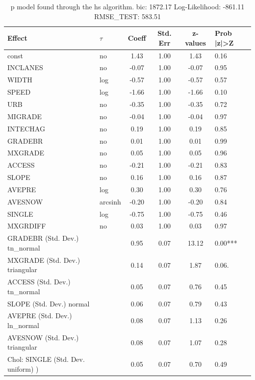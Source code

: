 \begin{table}
	\caption{p model found through the hs algorithm. bic: 1872.17 Log-Likelihood: -861.11 RMSE_TEST: 583.51}
	\begin{center}
		\begin{tabular}{|l|l|c|c|c|l|}
			\hline
			Effect & $\tau$ & Coeff & Std. Err & z-values & Prob |z|>Z \\
			\hline
			const & no & 1.43 & 1.00 & 1.43 & 0.16 \\
			\hline
			INCLANES & no & -0.07 & 1.00 & -0.07 & 0.95 \\
			\hline
			WIDTH & log & -0.57 & 1.00 & -0.57 & 0.57 \\
			\hline
			SPEED & log & -1.66 & 1.00 & -1.66 & 0.10 \\
			\hline
			URB & no & -0.35 & 1.00 & -0.35 & 0.72 \\
			\hline
			MIGRADE & no & -0.04 & 1.00 & -0.04 & 0.97 \\
			\hline
			INTECHAG & no & 0.19 & 1.00 & 0.19 & 0.85 \\
			\hline
			GRADEBR & no & 0.01 & 1.00 & 0.01 & 0.99 \\
			\hline
			MXGRADE & no & 0.05 & 1.00 & 0.05 & 0.96 \\
			\hline
			ACCESS & no & -0.21 & 1.00 & -0.21 & 0.83 \\
			\hline
			SLOPE & no & 0.16 & 1.00 & 0.16 & 0.87 \\
			\hline
			AVEPRE & log & 0.30 & 1.00 & 0.30 & 0.76 \\
			\hline
			AVESNOW & arcsinh & -0.20 & 1.00 & -0.20 & 0.84 \\
			\hline
			SINGLE & log & -0.75 & 1.00 & -0.75 & 0.46 \\
			\hline
			MXGRDIFF & no & 0.03 & 1.00 & 0.03 & 0.97 \\
			\hline
			GRADEBR (Std. Dev.) tn_normal &  & 0.95 & 0.07 & 13.12 & 0.00*** \\
			\hline
			MXGRADE (Std. Dev.) triangular &  & 0.14 & 0.07 & 1.87 & 0.06. \\
			\hline
			ACCESS (Std. Dev.) tn_normal &  & 0.05 & 0.07 & 0.76 & 0.45 \\
			\hline
			SLOPE (Std. Dev.) normal &  & 0.06 & 0.07 & 0.79 & 0.43 \\
			\hline
			AVEPRE (Std. Dev.) ln_normal &  & 0.08 & 0.07 & 1.13 & 0.26 \\
			\hline
			AVESNOW (Std. Dev.) triangular &  & 0.08 & 0.07 & 1.07 & 0.28 \\
			\hline
			 Chol: SINGLE (Std. Dev. uniform) ) &  & 0.05 & 0.07 & 0.70 & 0.49 \\

\end{tabular}
\end{center}
\end{table}
